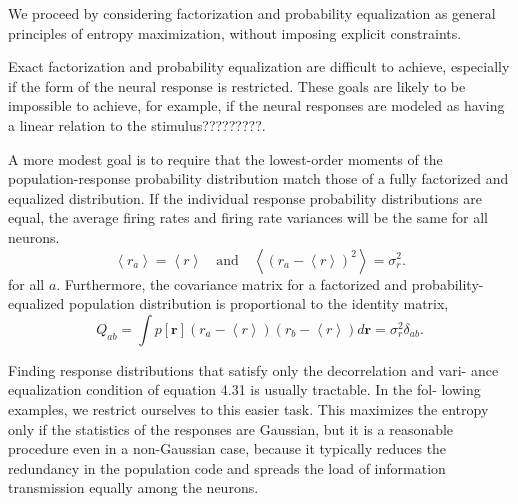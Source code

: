 \begin{rem}
  We proceed
by considering factorization and probability equalization as general principles of entropy maximization, without imposing explicit constraints.
\end{rem}

\begin{rem}
  Exact factorization and probability equalization are difficult to achieve,
especially if the form of the neural response is restricted. These goals are
likely to be impossible to achieve, for example, if the neural responses are
modeled as having a linear relation to the stimulus?????????. 
\end{rem}

\begin{thm}
  A more modest goal is to require that the lowest-order moments of the population-response probability distribution match those of a fully factorized and equalized
distribution. If the individual response probability distributions are
equal, the average firing rates and firing rate variances will be the
same for all neurons.
\begin{equation}
  \label{equ:variance}
  \left\langle r_a \right\rangle=\left\langle r \right\rangle
 \quad \text{and}\quad
  \left\langle (r_a-\left\langle r \right\rangle)^2 \right\rangle=\sigma_r^{2}.
\end{equation}
for all $a$.
Furthermore, the covariance
matrix for a factorized and probability-equalized population distribution
is proportional to the identity matrix,
\begin{equation}
  \label{equ:4.31}
  Q_{ab}=\int{p[\mathbf{r}]\left( r_a-\left\langle r \right\rangle \right)\left( r_b-\left\langle r \right\rangle \right)d\mathbf{r}}=\sigma_r^2\delta_{ab}.
\end{equation}
\end{thm}

\begin{rem}
  Finding response distributions that satisfy only the decorrelation and vari-
ance equalization condition of equation 4.31 is usually tractable. In the fol-
lowing examples, we restrict ourselves to this easier task. This maximizes
the entropy only if the statistics of the responses are Gaussian, but it is
a reasonable procedure even in a non-Gaussian case, because it typically
reduces the redundancy in the population code and spreads the load of
information transmission equally among the neurons.
\end{rem}

